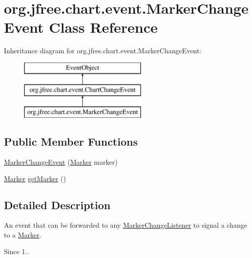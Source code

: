 \hypertarget{classorg_1_1jfree_1_1chart_1_1event_1_1_marker_change_event}{}\section{org.\+jfree.\+chart.\+event.\+Marker\+Change\+Event Class Reference}
\label{classorg_1_1jfree_1_1chart_1_1event_1_1_marker_change_event}
Inheritance diagram for org.\+jfree.\+chart.\+event.\+Marker\+Change\+Event\+:\begin{figure}[H]
\begin{center}
\leavevmode
\includegraphics[height=3.000000cm]{classorg_1_1jfree_1_1chart_1_1event_1_1_marker_change_event}
\end{center}
\end{figure}
\subsection*{Public Member Functions}
\begin{DoxyCompactItemize}
\item 
\mbox{\hyperlink{classorg_1_1jfree_1_1chart_1_1event_1_1_marker_change_event_a262b1e41bddc5249a75ddde8fa4ce0f0}{Marker\+Change\+Event}} (\mbox{\hyperlink{classorg_1_1jfree_1_1chart_1_1plot_1_1_marker}{Marker}} marker)
\item 
\mbox{\hyperlink{classorg_1_1jfree_1_1chart_1_1plot_1_1_marker}{Marker}} \mbox{\hyperlink{classorg_1_1jfree_1_1chart_1_1event_1_1_marker_change_event_a515fcbc1c0b93e3c61c199a39f25dc01}{get\+Marker}} ()
\end{DoxyCompactItemize}


\subsection{Detailed Description}
An event that can be forwarded to any \mbox{\hyperlink{interfaceorg_1_1jfree_1_1chart_1_1event_1_1_marker_change_listener}{Marker\+Change\+Listener}} to signal a change to a \mbox{\hyperlink{}{Marker}}.

\begin{DoxySince}{Since}
1.. 
\end{DoxySince}


